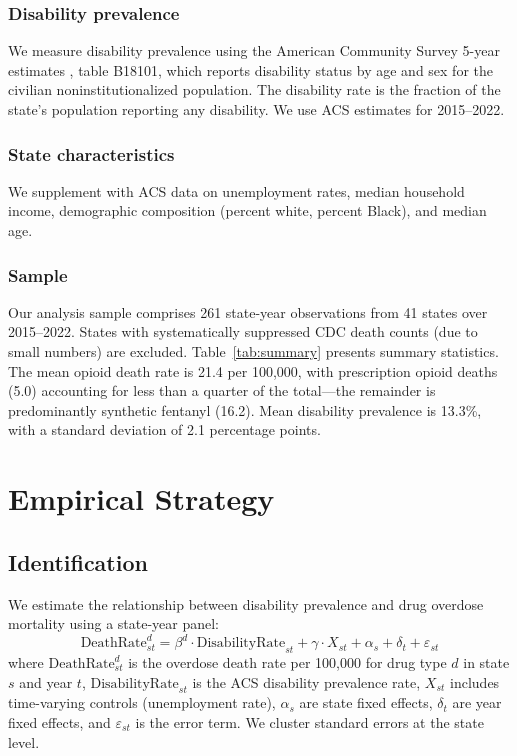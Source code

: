 \documentclass[12pt]{article}
\begin{document}
\subsubsection*{Disability prevalence} We measure disability prevalence using the American Community Survey 5-year estimates \citep{census2024acs}, table B18101, which reports disability status by age and sex for the civilian noninstitutionalized population. The disability rate is the fraction of the state's population reporting any disability. We use ACS estimates for 2015--2022.

\subsubsection*{State characteristics} We supplement with ACS data on unemployment rates, median household income, demographic composition (percent white, percent Black), and median age.

\subsubsection*{Sample} Our analysis sample comprises 261 state-year observations from 41 states over 2015--2022. States with systematically suppressed CDC death counts (due to small numbers) are excluded. Table~\ref{tab:summary} presents summary statistics. The mean opioid death rate is 21.4 per 100,000, with prescription opioid deaths (5.0) accounting for less than a quarter of the total---the remainder is predominantly synthetic fentanyl (16.2). Mean disability prevalence is 13.3\%, with a standard deviation of 2.1 percentage points.



\section{Empirical Strategy}

\subsection{Identification}

We estimate the relationship between disability prevalence and drug overdose mortality using a state-year panel:
\begin{equation}
\text{DeathRate}_{st}^{d} = \beta^{d} \cdot \text{DisabilityRate}_{st} + \gamma \cdot X_{st} + \alpha_s + \delta_t + \varepsilon_{st}
\label{eq:main}
\end{equation}
where $\text{DeathRate}_{st}^{d}$ is the overdose death rate per 100,000 for drug type $d$ in state $s$ and year $t$, $\text{DisabilityRate}_{st}$ is the ACS disability prevalence rate, $X_{st}$ includes time-varying controls (unemployment rate), $\alpha_s$ are state fixed effects, $\delta_t$ are year fixed effects, and $\varepsilon_{st}$ is the error term. We cluster standard errors at the state level.
\end{document}
